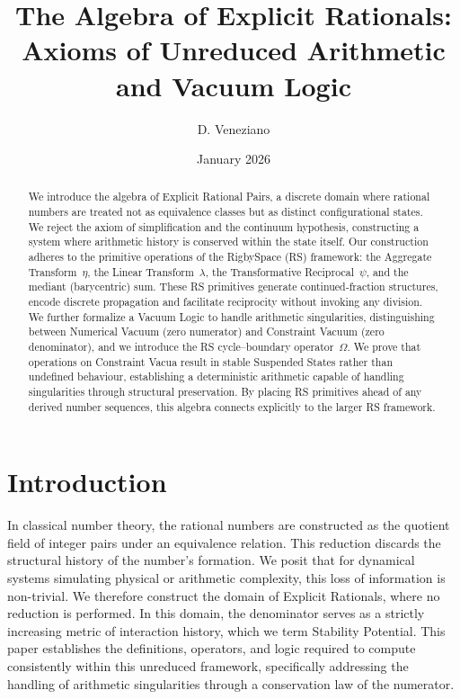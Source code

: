 \documentclass[11pt, letterpaper]{article}
\title{The Algebra of Explicit Rationals: Axioms of Unreduced Arithmetic and Vacuum Logic}
\author{D. Veneziano}
\date{January 2026}
\begin{document}
\maketitle

\begin{abstract}
We introduce the algebra of Explicit Rational Pairs, a discrete domain where rational numbers are treated not as equivalence classes but as distinct configurational states.  We reject the axiom of simplification and the continuum hypothesis, constructing a system where arithmetic history is conserved within the state itself.  Our construction adheres to the primitive operations of the RigbySpace (RS) framework: the Aggregate Transform~\(\eta\), the Linear Transform~\(\lambda\), the Transformative Reciprocal~\(\psi\), and the mediant (barycentric) sum.  These RS primitives generate continued‑fraction structures, encode discrete propagation and facilitate reciprocity without invoking any division.  We further formalize a Vacuum Logic to handle arithmetic singularities, distinguishing between Numerical Vacuum (zero numerator) and Constraint Vacuum (zero denominator), and we introduce the RS cycle–boundary operator~\(\Omega\).  We prove that operations on Constraint Vacua result in stable Suspended States rather than undefined behaviour, establishing a deterministic arithmetic capable of handling singularities through structural preservation.  By placing RS primitives ahead of any derived number sequences, this algebra connects explicitly to the larger RS framework.
\end{abstract}

\section{Introduction}

In classical number theory, the rational numbers are constructed as the quotient field of integer pairs under an equivalence relation. This reduction discards the structural history of the number's formation. We posit that for dynamical systems simulating physical or arithmetic complexity, this loss of information is non-trivial. We therefore construct the domain of Explicit Rationals, where no reduction is performed. In this domain, the denominator serves as a strictly increasing metric of interaction history, which we term Stability Potential. This paper establishes the definitions, operators, and logic required to compute consistently within this unreduced framework, specifically addressing the handling of arithmetic singularities through a conservation law of the numerator.
\end{document}
